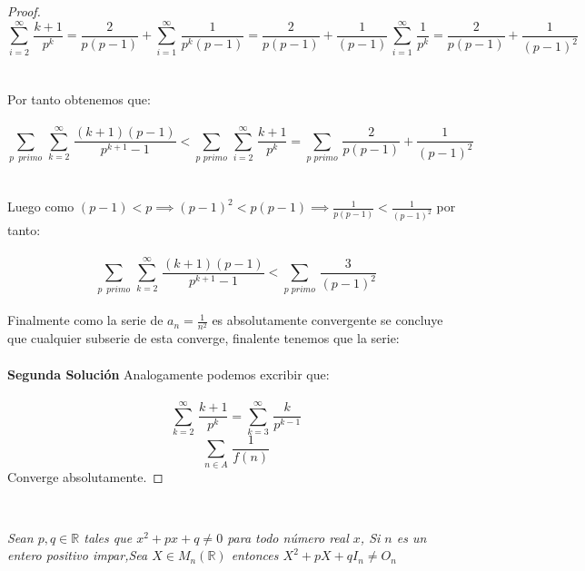 \documentclass[11pt,letterpaper]{article}
\newcommand{\R}{\mathbb{R}}
\begin{document}
\begin{proof}
\begin{equation*}
    \sum_{i=2}^{\infty}\,\frac{k+1}{p^k}=\frac{2}{p(p-1)}+\sum_{i=1}^{\infty}\,\frac{1}{p^k(p-1)}=\frac{2}{p(p-1)}+\frac{1}{(p-1)}\,\sum_{i=1}^{\infty}\,\frac{1}{p^k}=\frac{2}{p(p-1)}+\frac{1}{(p-1)^2}
\end{equation*}\,\\
 \,\\
Por tanto obtenemos que:\,\\
\,\\
\begin{equation*}
    \sum_{p\,\,\,primo}\,\sum_{k=2}^{\infty}\,\frac{(k+1)(p-1)}{p^{k+1}-1}<\sum_{p\,\,primo}\,\sum_{i=2}^{\infty}\,\frac{k+1}{p^k}=\sum_{p\,\,primo}\,\frac{2}{p(p-1)}+\frac{1}{(p-1)^2}
\end{equation*}\,\\
\,\\
Luego como $(p-1)<p\implies(p-1)^2<p(p-1)\implies\frac{1}{p(p-1)}<\frac{1}{(p-1)^2}$ por tanto:\,\\
\,\\
\begin{equation*}
    \sum_{p\,\,\,primo}\,\sum_{k=2}^{\infty}\,\frac{(k+1)(p-1)}{p^{k+1}-1}<\sum_{p\,\,primo}\,\frac{3}{(p-1)^2}
\end{equation*}\,\\
Finalmente como la serie de $a_n=\frac{1}{n^2}$ es absolutamente convergente se concluye que cualquier subserie de esta converge, finalente tenemos que la serie:\,\\
\,\\
\textbf{Segunda Soluci\'on}
Analogamente podemos excribir que:\,\\
\,\\
\begin{equation*}
    \sum_{k=2}^{\infty}\,\frac{k+1}{p^k}=\sum_{k=3}^{\infty}\,\frac{k}{p^{k-1}}
\end{equation*}
\begin{equation*}
    \sum_{n\in A}\,\frac{1}{f(n)}
\end{equation*}
Converge absolutamente.
\end{proof}\,\\
\begin{tcolorbox}[
	title = \textcolor{black}{\textcolor{white}{Problema 3}},]
\textit{Sean $p,q\in \R$ tales que $x^2+px+q\neq 0$ para todo n\'umero real $x$, Si $n$ es un entero positivo impar,Sea
$X\in M_n(\R)$ entonces $X^2+pX+qI_n\neq O_n$
}
\end{tcolorbox}
\end{document}
